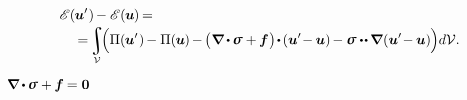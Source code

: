 \nopagebreak\vspace{-0.1em}\begin{equation*}
\begin{multlined}[\displaywidth]
\potentialenergyfunctional \hspace{.16ex} (\hspace{-0.1ex}\bm{u}'\hspace{.1ex}) \hspace{-0.2ex} -
\potentialenergyfunctional \hspace{.16ex} (\hspace{-0.1ex}\bm{u}\hspace{-0.1ex}) \hspace{-0.2ex}
=
\\[-0.1em]
%
= \hspace{-0.3ex}
\scalebox{0.9}{$\displaystyle\integral\displaylimits_{\mathcal{V}}$} \hspace{-0.44ex}
\Bigl(
\potentialenergydensity (\hspace{-0.1ex}\bm{u}'\hspace{.1ex}) \hspace{-0.2ex}
- \potentialenergydensity (\hspace{-0.1ex}\bm{u}\hspace{-0.1ex}) \hspace{-0.2ex}
- \hspace{-0.2ex} \bigl( \hspace{.1ex} \boldnabla \hspace{-0.1ex} \dotp \hspace{-0.1ex} \linearstress + \hspace{-0.1ex} \bm{f} \hspace{.1ex} \bigr) \hspace{-0.3ex} \dotp \hspace{-0.2ex} ( \bm{u}' \hspace{-0.4ex} - \hspace{-0.1ex} \bm{u} ) \hspace{-0.2ex}
- \linearstress \dotdotp \hspace{-0.1ex} \boldnabla \hspace{.1ex} ( \bm{u}' \hspace{-0.4ex} - \hspace{-0.1ex} \bm{u} ) \hspace{-0.1ex}
\Bigr) d\mathcal{V}
.
\end{multlined}
\end{equation*}

\noindent
{}
${ \hspace{-0.24ex}
\boldnabla
\hspace{-0.1ex} \dotp \hspace{-0.1ex}
\linearstress
+ \hspace{-0.1ex} \bm{f} \hspace{-0.15ex}
= \bm{0} }$

